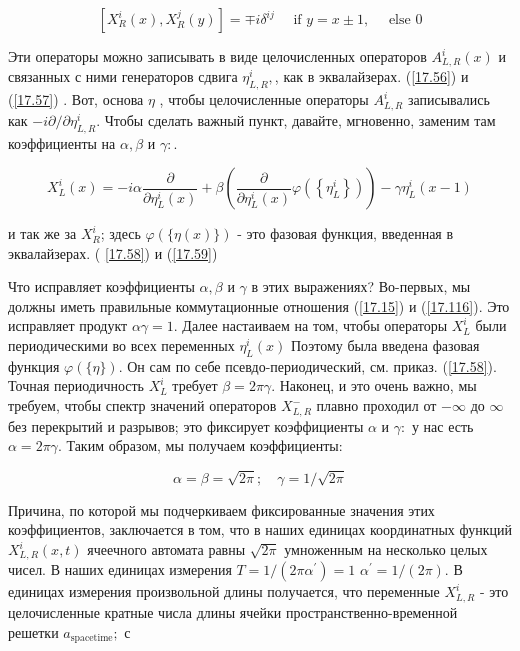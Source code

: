 \documentclass[main.tex]{subfiles}
\begin{document}
\begin{equation}\label{17.116}
\left[X_{R}^{i}(x), X_{R}^{j}(y)\right]=\mp i \delta^{i j} \quad \text { if } y=x \pm 1, \quad \text { else } 0
\end{equation}

Эти операторы можно записывать в виде целочисленных операторов $A_{L, R}^{i}(x)$ и связанных с ними генераторов сдвига $\eta_{L, R}^{i},$, как в эквалайзерах. (\ref{17.56}) и (\ref{17.57}) . Вот, основа $\eta$ , чтобы целочисленные операторы $A_{L, R}^{i}$ записывались как $-i \partial / \partial \eta_{L, R}^{i}$. Чтобы сделать важный пункт, давайте, мгновенно, заменим там коэффициенты на $\alpha, \beta$ и $\gamma:$.

\begin{equation}\label{17.117}
X_{L}^{i}(x)=-i \alpha \frac{\partial}{\partial \eta_{L}^{i}(x)}+\beta\left(\frac{\partial}{\partial \eta_{L}^{i}(x)} \varphi\left(\left\{\eta_{L}^{i}\right\}\right)\right)-\gamma \eta_{L}^{i}(x-1)
\end{equation}

и так же за $X_{R}^{i}$; здесь $\varphi(\{\eta(x)\})$ - это фазовая функция, введенная в эквалайзерах. ( \ref{17.58}) и (\ref{17.59})

Что исправляет коэффициенты $\alpha, \beta$ и $\gamma$ в этих выражениях? Во-первых, мы должны иметь правильные коммутационные отношения (\ref{17.15}) и (\ref{17.116}). Это исправляет продукт $\alpha \gamma=1 .$ Далее настаиваем на том, чтобы операторы $X_{L}^{i}$ были периодическими во всех переменных $\eta_{L}^{i}(x)$ Поэтому была введена фазовая функция $\varphi(\{\eta\})$. Он сам по себе псевдо-периодический, см. приказ. (\ref{17.58}). Точная периодичность $X_{L}^{i}$ требует $\beta=2 \pi \gamma .$ Наконец, и это очень важно, мы требуем, чтобы спектр значений операторов $X_{L, R}^{-}$ плавно проходил от $-\infty$ до $\infty$ без перекрытий и разрывов; это фиксирует коэффициенты $\alpha$ и $\gamma:$ у нас есть $\alpha=2 \pi \gamma .$ Таким образом, мы получаем коэффициенты:

\begin{equation}\label{17.118}
\alpha=\beta=\sqrt{2 \pi} ; \quad \gamma=1 / \sqrt{2 \pi}
\end{equation}


Причина, по которой мы подчеркиваем фиксированные значения этих коэффициентов, заключается в том, что в наших единицах координатных функций $X_{L, R}^{i}(x, t)$ ячеечного автомата равны $\sqrt{2 \pi}$ умноженным на несколько целых чисел. В наших единицах измерения $T=1 /\left(2 \pi \alpha^{\prime}\right)=1$ $\alpha^{\prime}=1 /(2 \pi) .$ В единицах измерения произвольной длины получается, что переменные $X_{L, R}^{i}$ - это целочисленные кратные числа длины ячейки пространственно-временной решетки $a_{\text {spacetime}};$ с
\end{document}
